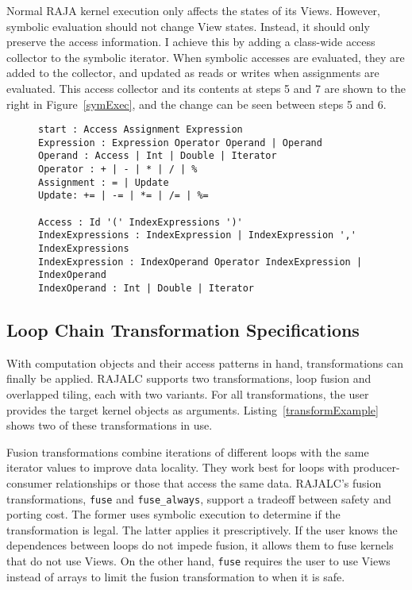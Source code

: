 Normal RAJA kernel execution only affects the states of its Views. 
However, symbolic evaluation should not change View states. 
Instead, it should only preserve the access information.
I achieve this by adding a class-wide access collector to the symbolic iterator. 
When symbolic accesses are evaluated, they are added to the collector, and updated as reads or writes when assignments are evaluated.
This access collector and its contents at steps 5 and 7 are shown to the right in Figure~\ref{symExec}, and the change can be seen between steps 5 and 6.


\begin{figure}[t]
\begin{lstlisting}[label={ExpressionGrammar},caption={EBNF Grammar to Support Symbolic Evaluation}]
start : Access Assignment Expression
Expression : Expression Operator Operand | Operand
Operand : Access | Int | Double | Iterator
Operator : + | - | * | / | %
Assignment : = | Update
Update: += | -= | *= | /= | %=

Access : Id '(' IndexExpressions ')'
IndexExpressions : IndexExpression | IndexExpression ',' IndexExpressions
IndexExpression : IndexOperand Operator IndexExpression | IndexOperand
IndexOperand : Int | Double | Iterator
\end{lstlisting}
\end{figure}
	
\subsection{Loop Chain Transformation Specifications}\label{sec:transspec}

With computation objects and their access patterns in hand, transformations can finally be applied.
RAJALC supports two transformations, loop fusion and overlapped tiling, each with two variants.
For all transformations, the user provides the target kernel
objects as arguments.
Listing~\ref{transformExample} shows two of these transformations in use.

Fusion transformations combine iterations of different loops with the same iterator
values to improve data locality.
They work best for loops with producer-consumer relationships or those that
access the same data.
RAJALC's fusion transformations, \verb.fuse. and \verb.fuse_always., support
a tradeoff between safety and porting cost.
The former uses symbolic execution to determine if the transformation is legal.
The latter applies it prescriptively.
If the user knows the dependences between loops do not impede fusion,
it allows them to fuse kernels that do not use Views. 
On the other hand, \verb.fuse. requires the user to use Views instead
of arrays to limit the fusion transformation to when it is safe.

